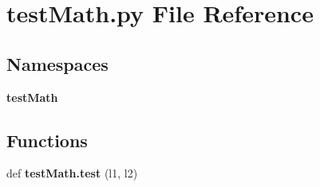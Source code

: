 \section{test\+Math.\+py File Reference}
\label{test_math_8py}
\subsection*{Namespaces}
\begin{DoxyCompactItemize}
\item 
 \textbf{ test\+Math}
\end{DoxyCompactItemize}
\subsection*{Functions}
\begin{DoxyCompactItemize}
\item 
def \textbf{ test\+Math.\+test} (l1, l2)
\end{DoxyCompactItemize}
